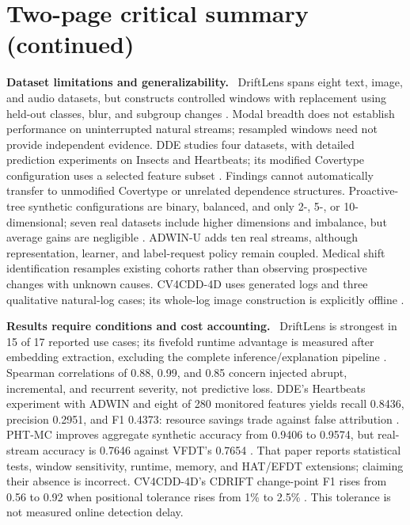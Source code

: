 \documentclass[10pt,a4paper]{article}
\newcommand{\lead}[1]{\textbf{#1}\ }
\begin{document}
\section*{Two-page critical summary (continued)}
\lead{Dataset limitations and generalizability.}
DriftLens spans eight text, image, and audio datasets, but constructs controlled windows with replacement using held-out classes, blur, and subgroup changes \cite[Sec.~V-A]{greco}. Modal breadth does not establish performance on uninterrupted natural streams; resampled windows need not provide independent evidence. DDE studies four datasets, with detailed prediction experiments on Insects and Heartbeats; its modified Covertype configuration uses a selected feature subset \cite[Secs.~4--5]{szucs}. Findings cannot automatically transfer to unmodified Covertype or unrelated dependence structures. Proactive-tree synthetic configurations are binary, balanced, and only 2-, 5-, or 10-dimensional; seven real datasets include higher dimensions and imbalance, but average gains are negligible \cite[Secs.~5--6]{guerrero}. ADWIN-U adds ten real streams, although representation, learner, and label-request policy remain coupled. Medical shift identification resamples existing cohorts rather than observing prospective changes with unknown causes. CV4CDD-4D uses generated logs and three qualitative natural-log cases; its whole-log image construction is explicitly offline \cite{assis,roschewitz,kraus}.

\lead{Results require conditions and cost accounting.}
DriftLens is strongest in 15 of 17 reported use cases; its fivefold runtime advantage is measured after embedding extraction, excluding the complete inference/explanation pipeline \cite[Sec.~V]{greco}. Spearman correlations of 0.88, 0.99, and 0.85 concern injected abrupt, incremental, and recurrent severity, not predictive loss. DDE's Heartbeats experiment with ADWIN and eight of 280 monitored features yields recall 0.8436, precision 0.2951, and F1 0.4373: resource savings trade against false attribution \cite[Table~4]{szucs}. PHT-MC improves aggregate synthetic accuracy from 0.9406 to 0.9574, but real-stream accuracy is 0.7646 against VFDT's 0.7654 \cite[Tables~7,14]{guerrero}. That paper reports statistical tests, window sensitivity, runtime, memory, and HAT/EFDT extensions; claiming their absence is incorrect. CV4CDD-4D's CDRIFT change-point F1 rises from 0.56 to 0.92 when positional tolerance rises from 1\% to 2.5\% \cite[Table~3]{kraus}. This tolerance is not measured online detection delay.
\end{document}
